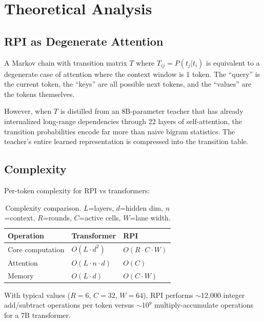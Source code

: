 \documentclass[10pt,twocolumn]{article}
\begin{document}
\section{Theoretical Analysis}
\label{sec:theory}

\subsection{RPI as Degenerate Attention}

A Markov chain with transition matrix $T$ where $T_{ij} = P(t_{j} | t_{i})$ is equivalent to a degenerate case of attention where the context window is 1 token. The ``query'' is the current token, the ``keys'' are all possible next tokens, and the ``values'' are the tokens themselves.

However, when $T$ is distilled from an 8B-parameter teacher that has already internalized long-range dependencies through 22 layers of self-attention, the transition probabilities encode far more than naive bigram statistics. The teacher's entire learned representation is compressed into the transition table.

\subsection{Complexity}

Per-token complexity for RPI vs transformers:

\begin{table}[h]
\centering
\small
\begin{tabular}{lll}
\toprule
\textbf{Operation} & \textbf{Transformer} & \textbf{RPI} \\
\midrule
Core computation & $O(L \cdot d^2)$ & $O(R \cdot C \cdot W)$ \\
Attention & $O(L \cdot n \cdot d)$ & $O(C)$ \\
Memory & $O(L \cdot d)$ & $O(C \cdot W)$ \\
\bottomrule
\end{tabular}
\caption{Complexity comparison. $L$=layers, $d$=hidden dim, $n$=context, $R$=rounds, $C$=active cells, $W$=lane width.}
\label{tab:complexity}
\end{table}

With typical values ($R=6$, $C=32$, $W=64$), RPI performs $\sim$12,000 integer add/subtract operations per token versus $\sim$10$^9$ multiply-accumulate operations for a 7B transformer.

\end{document}
